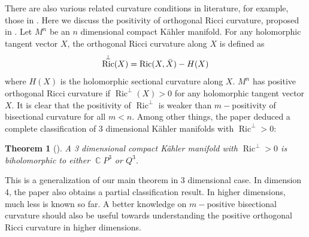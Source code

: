 \documentclass[11pt]{amsart}
\theoremstyle{plain}
\newtheorem{thm}{Theorem}[section]
\theoremstyle{definition}
\numberwithin{equation}{section}
\DeclareMathOperator{\C}{\mathbb{C}}
\DeclareMathOperator{\Ricci}{Ric}
\begin{document}
There are also various related curvature conditions in literature, for example, those in \cite{NWZ21,Ni21,NZ25}. Here we discuss the positivity of orthogonal Ricci curvature, proposed in \cite{NWZ21}. Let $M^n$ be an $n$ dimensional compact K\"{a}hler manifold. For any holomorphic tangent vector $X$, the orthogonal Ricci curvature along $X$ is defined as 
\begin{equation}
    \Ricci^\perp(X)=\Ricci(X,\Bar{X})-H(X)
\end{equation}
where $H(X)$ is the holomorphic sectional curvature along $X$. $M^n$ has positive orthogonal Ricci curvature if $\Ricci^\perp(X)>0$ for any holomorphic tangent vector $X$. It is clear that the positivity of $\Ricci^\perp$ is weaker than $m-$positivity of bisectional curvature for all $m<n$. Among other things, the paper \cite{NWZ21} deduced a complete classification of 3 dimensional K\"{a}hler manifolds with $\Ricci^\perp>0$:
\begin{thm}[]
    A 3 dimensional compact K\"{a}hler manifold with $\Ricci^\perp>0$ is biholomorphic to either $\C P^3$ or $Q^3$.
\end{thm}
This is a generalization of our main theorem in 3 dimensional case. In dimension 4, the paper also obtains a partial classification result. In higher dimensions, much less is known so far. A better knowledge on $m-$positive bisectional curvature should also be useful towards understanding the positive orthogonal Ricci curvature in higher dimensions.



 
\end{document}

